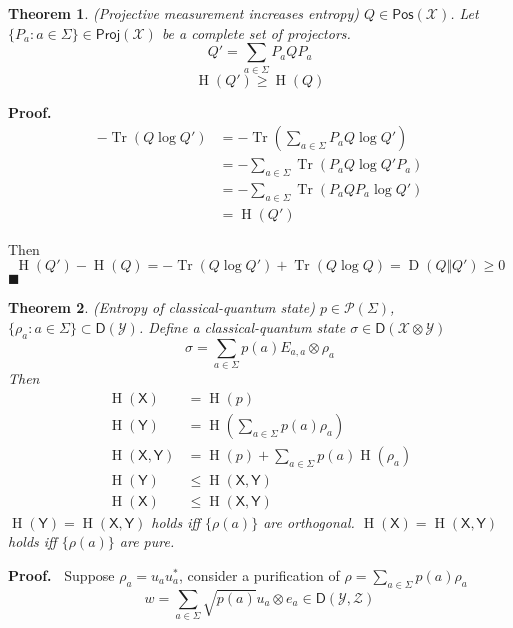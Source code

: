 \documentclass[aps,pra,onecolumn,notitlepage,superscriptaddress]{revtex4-1}
\newcommand{\reg}[1]{\mathsf{#1}}
\newcommand{\spc}[1]{\mathcal{#1}}
\newcommand{\Pos}{\mathsf{Pos}}
\newcommand{\D}{\mathsf{D}}
\newcommand{\Proj}{\mathsf{Proj}}
\newcommand{\Tr}{\operatorname{Tr}}
\newcommand{\op}[1]{\operatorname{#1}}
\newtheorem{theo}{Theorem}
\def\Proof{{\bf Proof.~}}
\def\qed{$\blacksquare$ \newline}
\begin{document}
    \begin{theo}
        (Projective measurement increases entropy) $Q \in \Pos(\spc X)$. Let $\{ P_a : a \in \Sigma \} \in \Proj(\spc X)$ be a complete set of projectors.
        \begin{equation}
            Q' = \sum_{a \in \Sigma} P_a Q P_a
        \end{equation}
        \begin{equation}
            \op H(Q') \geq \op H(Q)
        \end{equation}
    \end{theo}
    \Proof 
    \begin{align*}
        - \Tr(Q \log Q')
        &= -\Tr \left(\sum_{a \in \Sigma} P_a Q \log Q' \right) \\
        &= -\sum_{a \in \Sigma}\Tr  (P_a Q \log Q' P_a) \\
        &= -\sum_{a \in \Sigma}\Tr  (P_a Q P_a \log Q') \\
        &= \op H(Q')
    \end{align*}

    Then
    \begin{equation}
        \op H(Q') - \op H(Q) = - \Tr(Q \log Q') + \Tr(Q \log Q) = \op D(Q \Vert Q') \geq 0
    \end{equation}
    \qed

    \begin{theo}
        (Entropy of classical-quantum state) $p \in \spc P(\Sigma)$, $\{ \rho_a : a \in \Sigma \} \subset \D(\spc Y)$. Define a classical-quantum state $\sigma \in \D(\spc X \otimes \spc Y)$
        \begin{equation}
            \sigma = \sum_{a \in \Sigma} p(a) E_{a,a} \otimes \rho_a
        \end{equation}
        Then
        \begin{align*}
            \op H(\reg X) &= \op H(p) \\
            \op H(\reg Y) &= \op H \left(\sum_{a \in \Sigma} p(a) \rho_a \right) \\
            \op H(\reg X, \reg Y) &= \op H(p) + \sum_{a \in \Sigma} p(a) \op H(\rho_a) \\
            \op H(\reg Y) &\leq \op H(\reg X, \reg Y) \\
            \op H(\reg X) &\leq \op H(\reg X, \reg Y)
        \end{align*}
    $\op H(\reg Y) = \op H(\reg X, \reg Y)$ holds iff $\{\rho(a)\}$ are orthogonal. $\op H(\reg X) = \op H(\reg X, \reg Y)$ holds iff $\{\rho(a)\}$ are pure.
    \end{theo}
    \Proof
    Suppose $\rho_a = u_au_a^*$, consider a purification of $\rho = \sum_{a \in \Sigma} p(a) \rho_a$
    \begin{equation}
        w = \sum_{a \in \Sigma} \sqrt{p(a)} u_a \otimes e_a \in \D(\spc Y, \spc Z)
    \end{equation}
    
\end{document}
